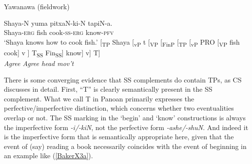 \documentclass[output=paper,colorlinks,citecolor=brown,
]{langscibook}
\renewcommand{\sc}[1]{\textsc{#1}}
\begin{document}
\begin{exe}
    \ex Yawanawa (fieldwork) \label{BakerX21}
	    \begin{xlist}
			\ex \label{BakerX21a}
			\gll Shaya-N yuma pitxaN-ki-N tapiN-a.\\
			     Shaya-\sc{erg} fish cook-\sc{ss-erg} know-\sc{pfv}\\
			    \glt `Shaya knows how to cook fish.'
			\ex \label{BakerX21b}
			    \small[\textsubscript{TP }Shaya [\textsubscript{vP }t [\textsubscript{VP }[\textsubscript{FinP }[\textsubscript{TP }[\textsubscript{vP } PRO [\textsubscript{VP }fish cook] v ]  T\textsubscript{SS} Fin\textsubscript{SS}] know] v] T]\\
			    \textit{Agree \hspace{7.5em} Agree \hspace{11em}head mov't}
		\end{xlist}
\end{exe}
\vspace{16pt}
There is some converging evidence that SS complements do contain TPs, as CS discusses in detail. First, “T” is clearly semantically present in the SS complement. What we call T in Panoan primarily expresses the perfective/imperfective distinction, which concerns whether two eventualities overlap or not. The SS marking in the `begin’ and `know’ constructions is always the imperfective form \textit{-i/-kiN}, not the perfective form \textit{-ashe/-shuN}. And indeed it is the imperfective form that is semantically appropriate here, given that the event of (say) reading a book necessarily coincides with the event of beginning in an example like (\ref{BakerX3a}).\\
\end{document}
